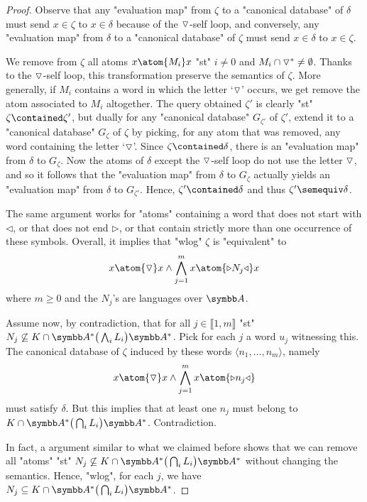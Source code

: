 \begin{proof}
	Observe that any "evaluation map" from $\zeta$ to a "canonical database"
	of $\delta$ must send $x \in \zeta$ to $x \in \delta$ because of the $\triangledown$-self loop,
	and conversely, any "evaluation map" from $\delta$ to a "canonical database"
	of $\zeta$ must send $x \in \delta$ to $x \in \zeta$.

	We remove from $\zeta$ all atoms $x \atom{M_i} x$ "st" $i \neq 0$
	and $M_i \cap {\triangledown^*} \neq\emptyset$. Thanks to the
	$\triangledown$-self loop, this transformation preserve the semantics of $\zeta$.
	More generally, if $M_i$ contains a word in which the letter `$\triangledown$' occurs, we get remove 
	the atom associated to $M_i$ altogether. The query obtained $\zeta'$ is clearly
	"st" $\zeta \contained \zeta'$, but dually for any "canonical database" $G_{\zeta'}$ of
	$\zeta'$, extend it to a "canonical database" $G_{\zeta}$ of $\zeta$ by picking, for any
	atom that was removed, any word containing the letter `$\triangledown$'.
	Since $\zeta \contained \delta$, there is an "evaluation map" from $\delta$
	to $G_{\zeta}$. Now the atoms of $\delta$ except the $\triangledown$-self loop
	do not use the letter $\triangledown$, and so it follows that the
	"evaluation map" from $\delta$ to $G_{\zeta}$ actually yields
	an "evaluation map" from $\delta$ to $G_{\zeta'}$.
	Hence, $\zeta' \contained \delta$ and thus $\zeta' \semequiv \delta$.

	The same argument works for "atoms" containing a word that does not
	start with $\triangleleft$, or that does not end $\triangleright$,
	or that contain strictly more than one occurrence of these symbols.
	Overall, it implies that "wlog" $\zeta$ is "equivalent" to
	\[
		x \atom{\marking} x \land \bigwedge_{j=1}^{m} x \atom{\triangleright N_j \triangleleft} x
	\]
	where $m \geq 0$ and the $N_j$'s are languages over $\A$.

	Assume now, by contradiction, that for all $j \in \lBrack 1,m \rBrack$
	"st" $N_j \not\subseteq K \cap \A^* \big(\bigwedge_i L_i\big) \A^*$. Pick for each $j$ a word $u_j$ witnessing this. 
	The canonical database of $\zeta$ induced by these
	words $\langle n_1, \dotsc, n_m \rangle$, namely
	\[x \atom{\marking} x \land \bigwedge_{j=1}^m x \atom{\triangleright n_j \triangleleft}\]
	must satisfy $\delta$. But this implies that at least one $n_j$ must belong to
	$K \cap \A^* \big(\bigcap_i L_i\big) \A^*$.
	Contradiction.
	
	In fact, a argument similar to what we claimed before shows that
	we can remove all "atoms" "st" $N_j \not\subseteq K \cap \A^* \big(\bigcap_i L_i\big) \A^*$ without changing the semantics.
	Hence, "wlog", for each $j$, we have $N_j \subseteq K \cap \A^* \big(\bigcap_i L_i\big) \A^*$.


\end{proof}
